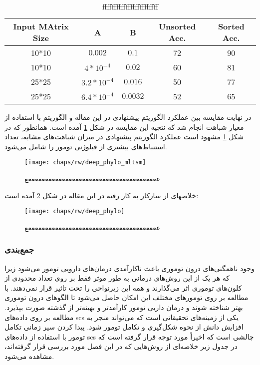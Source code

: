 \begin{latin}
\begin{table}[!ht]
	\centering
	\begin{tabular}{|c|c|c|c|c|}
		\hline
		\rowcolor[gray]{0.9}
		Input MAtrix Size & A            & B        & Unsorted Acc. & Sorted Acc.  	 \\\hline
		10*10               & $0.002$       & $0.1$    & 72            & 90          \\\hline
		10*10               & $4*10^{-4}$   & $0.02$   & 60            & 81          \\\hline
		25*25               & $3.2*10^{-4}$ & $0.016$  & 50            & 77          \\\hline
		25*25               & $6.4*10^{-4}$ & $0.0032$ & 52            & 65         \\\hline
	\end{tabular}\par
\caption{ffffffffffffffffffffffff}
\label{tab:table_55}
\end{table}
\end{latin}



در نهایت مقایسه بین عملکرد الگوریتم پیشنهادی در این مقاله و الگوریتم  با استفاده از معیار شباهت  انجام شد که نتجیه این مقایسه در شکل \ref{fig:ch_rw:deep_phylo_mltsm} آمده است. همانطور که در شکل \ref{fig:ch_rw:deep_phylo_mltsm} مشهود است عملکرد الگوریتم پیشنهادی در میزان شباهت‌های مشابه، تعداد استنباط‌های بیشتری از فیلوژنی تومور را شامل می‌شود. 


\begin{figure}[!ht]
	\centerline{\texttt{[image: chaps/rw/deep\_phylo\_mltsm]}}
	\caption{عععععععععععععععععععععععععععععععععععععععع}
	\label{fig:ch_rw:deep_phylo_mltsm}
\end{figure}


خلاصهای از سازکار به کار رفته در این مقاله در شکل \ref{fig:ch_rw:deep_phylo} آمده است: 

\begin{figure}[!ht]
	\centerline{\texttt{[image: chaps/rw/deep\_phylo]}}
	\caption{عععععععععععععععععععععععععععععععععععععععع}
	\label{fig:ch_rw:deep_phylo}
\end{figure}





\subsubsection{جمع‌بندی}
وجود ناهمگنی‌های درون توموری باعث ناکارآمدی درمان‌های دارویی تومور می‌شود زیرا که هر یک از این روش‌های درمانی به طور موثر فقط بر روی تعداد محدودی از کلون‌های توموری اثر می‌گذارند و همه این زیرنواحی را تحت تاثیر قرار نمی‌دهند. با مطالعه بر روی تومورهای مختلف این امکان حاصل می‌شود تا الگوهای درون توموری بهتر شناخته شوند و درمان داریی تومور کارآمدتر و بهینه‌تر از گذشته صورت بپذیرد. مطالعه بر روی داده‌های \gls{scs} یکی از زمینه‌های تحقیقاتی است که می‌تواند منجر به افزایش دانش از نحوه شکل‌گیری و تکامل تومور شود. پیدا کردن سیر زمانی تکامل تومور با استفاده از داده‌های \gls{scs} چالشی است که اخیراً مورد توجه قرار گرفته است که در جدول زیر خلاصه‌ای از روش‌هایی که در این فصل مورد بررسی قرار گرفته‌اند، مشاهده می‌شود. 


